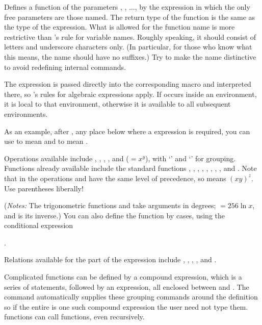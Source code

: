 \documentclass[letterpaper]{article}
\begin{document}
Defines a \MF{} function  of the parameters ,
, $\ldots$, by the \MF{} expression  in which
the only free parameters are those named.  The return type of the
function is the same as the type of the expression. What is allowed for
the function name  is more restrictive than \MF{}'s rule for
variable names. Roughly speaking, it should consist of letters and
underscore characters only. (In particular, for those who know what
this means, the name should have no suffixes.) Try to make the name
distinctive to avoid redefining internal \MF{} commands.

The expression  is passed directly into the corresponding
\MF{} macro and interpreted there, so \MF{}'s rules for algebraic
expressions apply. If  occurs inside an 
environment, it is local to that environment, otherwise it is available
to all subsequent  environments.

As an example, after , any
place below where a \MF{} expression is required, you can use
 to mean  and  to mean
.

Operations available include \mfc{+}, \mfc{-}, \mfc{*}, \mfc{/}, and
\mfc{**} ($=x^y$), with `\mfc{(}' and `\mfc{)}' for grouping.
Functions already available include the standard \MF{} functions
, , , , ,
, , , and . Note that in \MF{}
the operations \mfc{*} and \mfc{**} have the same level of precedence,
so  means $(xy)^z$. Use parentheses liberally!

(\textit{Notes:} The \MF{} trigonometric functions  and
 take arguments in degrees; $=256\ln x$, and
 is its inverse.) You can also define the function 
by cases, using the \MF{} conditional expression
\begin{ex}
  .
\end{ex}
Relations available for the  part of the expression
include \mfc{=}, \mfc{<}, \mfc{>}, \mfc{<=}, \mfc{<>} and \mfc{>=}.

Complicated functions can be defined by a compound expression, which is
a series of \MF{} statements, followed by an expression, all enclosed
between  and . The  command
automatically supplies these grouping commands around the definition so
if the entire  is one such compound expression the user
need not type them. \CMF{} functions can call \MF{} functions, even
recursively.
\end{document}
